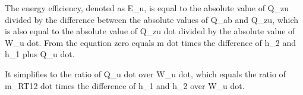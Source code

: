 The energy efficiency, denoted as E_u, is equal to the absolute value of Q_zu divided by the difference between the absolute values of Q_ab and Q_zu, which is also equal to the absolute value of Q_zu dot divided by the absolute value of W_u dot. From the equation zero equals m dot times the difference of h_2 and h_1 plus Q_u dot.

It simplifies to the ratio of Q_u dot over W_u dot, which equals the ratio of m_RT12 dot times the difference of h_1 and h_2 over W_u dot.